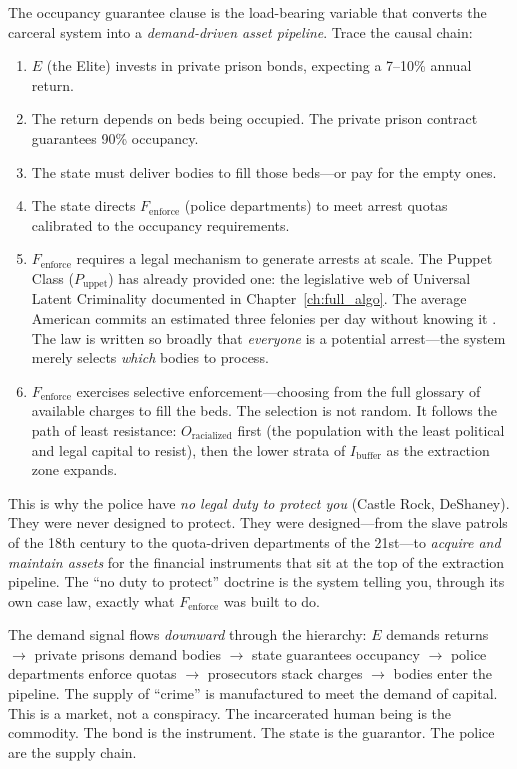 The occupancy guarantee clause is the load-bearing variable that converts the carceral system into a \textit{demand-driven asset pipeline}. Trace the causal chain:

\begin{enumerate}
    \item $E$ (the Elite) invests in private prison bonds, expecting a 7--10\% annual return.
    \item The return depends on beds being occupied. The private prison contract guarantees 90\% occupancy.
    \item The state must deliver bodies to fill those beds---or pay for the empty ones.
    \item The state directs $F_{\text{enforce}}$ (police departments) to meet arrest quotas calibrated to the occupancy requirements.
    \item $F_{\text{enforce}}$ requires a legal mechanism to generate arrests at scale. The Puppet Class ($P_{\text{uppet}}$) has already provided one: the legislative web of Universal Latent Criminality documented in Chapter~\ref{ch:full_algo}. The average American commits an estimated three felonies per day without knowing it \cite{silverglate}. The law is written so broadly that \textit{everyone} is a potential arrest---the system merely selects \textit{which} bodies to process.
    \item $F_{\text{enforce}}$ exercises selective enforcement---choosing from the full glossary of available charges to fill the beds. The selection is not random. It follows the path of least resistance: $O_{\text{racialized}}$ first (the population with the least political and legal capital to resist), then the lower strata of $I_{\text{buffer}}$ as the extraction zone expands.
\end{enumerate}

This is why the police have \textit{no legal duty to protect you} (Castle Rock, DeShaney). They were never designed to protect. They were designed---from the slave patrols of the 18th century to the quota-driven departments of the 21st---to \textit{acquire and maintain assets} for the financial instruments that sit at the top of the extraction pipeline. The ``no duty to protect'' doctrine is the system telling you, through its own case law, exactly what $F_{\text{enforce}}$ was built to do.

The demand signal flows \textit{downward} through the hierarchy: $E$ demands returns $\rightarrow$ private prisons demand bodies $\rightarrow$ state guarantees occupancy $\rightarrow$ police departments enforce quotas $\rightarrow$ prosecutors stack charges $\rightarrow$ bodies enter the pipeline. The supply of ``crime'' is manufactured to meet the demand of capital. This is a market, not a conspiracy. The incarcerated human being is the commodity. The bond is the instrument. The state is the guarantor. The police are the supply chain.

